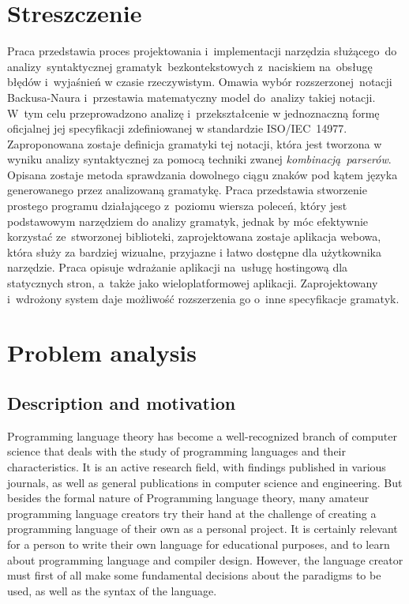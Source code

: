 \documentclass[english,engineering]{wizthesis}
\begin{document}
{\let\clearpage\relax %
\chapter*{Streszczenie}

Praca przedstawia proces projektowania i~implementacji narzędzia służącego~do
analizy~syntaktycznej gramatyk~bezkontekstowych z~naciskiem na~obsługę błędów
i~wyjaśnień w czasie rzeczywistym. Omawia wybór rozszerzonej~notacji
Backusa-Naura i~przestawia matematyczny model do~analizy takiej notacji. W~tym
celu przeprowadzono analizę i~przekształcenie w jednoznaczną formę oficjalnej
jej specyfikacji zdefiniowanej w standardzie ISO/IEC~14977. Zaproponowana
zostaje definicja gramatyki tej notacji, która jest tworzona w wyniku analizy
syntaktycznej za pomocą techniki zwanej \textit{kombinacją~parserów}. Opisana
zostaje metoda sprawdzania dowolnego ciągu znaków pod kątem języka generowanego
przez analizowaną gramatykę. Praca przedstawia stworzenie prostego programu
działającego z~poziomu wiersza poleceń, który jest podstawowym narzędziem do
analizy gramatyk, jednak by móc efektywnie korzystać ze~stworzonej biblioteki,
zaprojektowana zostaje aplikacja webowa, która służy za bardziej wizualne,
przyjazne i łatwo dostępne dla użytkownika narzędzie. Praca opisuje wdrażanie
aplikacji na~usługę hostingową dla statycznych stron, a~także jako
wieloplatformowej aplikacji. Zaprojektowany i~wdrożony system daje możliwość
rozszerzenia go o~inne specyfikacje gramatyk.}

\tableofcontents

\mainmatter %

\chapter{Problem analysis}

\section{Description and motivation} \label{sec:description-and-motivation}

Programming language theory has become a well-recognized branch of computer
science that deals with the study of programming languages and their
characteristics. It is an active research field, with findings published in
various journals, as well as general publications in computer science and
engineering. But besides the formal nature of Programming language theory, many
amateur programming language creators try their hand at the challenge of
creating a programming language of their own as a personal project. It is
certainly relevant for a person to write their own language for educational
purposes, and to learn about programming language and compiler design. However,
the language creator must first of all make some fundamental decisions about the
paradigms to be used, as well as the syntax of the language.
\end{document}
